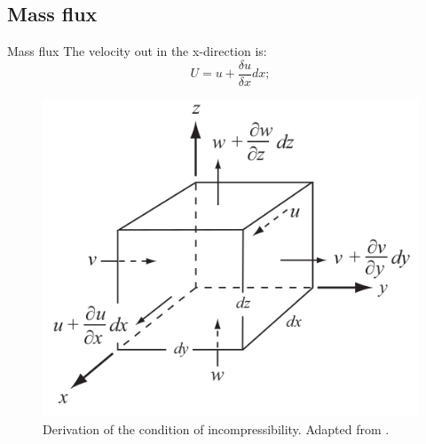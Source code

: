 \documentclass[11pt]{beamer}
\begin{document}
	\subsection{Mass flux}
		\begin{frame}{Mass flux}
		\justifying
		The velocity out in the x-direction is:
		\begin{equation}
			U = u+\frac{\delta u}{\delta x}dx;
		\end{equation}
		\begin{figure}
			\centering
			\includegraphics[scale=0.2]{../fig/Control_volume.png}
			\caption{Derivation of the condition of incompressibility. Adapted from \cite{hooke2019principles}.}
			\label{control_volume}
		\end{figure}
		\end{frame}
\end{document}
